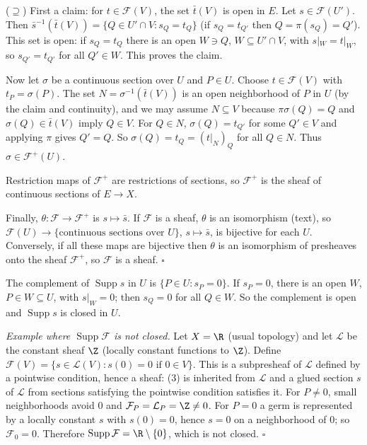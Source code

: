\documentclass[11pt]{article}
\begin{document}
($\supseteq$) First a claim: for $t\in\mathcal F(V)$, the set $\bar t(V)$ is open in $E$. Let $s\in\mathcal F(U')$. Then $\bar s^{-1}(\bar t(V))=\{Q\in U'\cap V: s_Q=t_Q\}$ (if $s_Q=t_{Q'}$ then $Q=\pi(s_Q)=Q'$). This set is open: if $s_Q=t_Q$ there is an open $W\ni Q$, $W\subseteq U'\cap V$, with $s|_W=t|_W$, so $s_{Q'}=t_{Q'}$ for all $Q'\in W$. This proves the claim.

Now let $\sigma$ be a continuous section over $U$ and $P\in U$. Choose $t\in\mathcal F(V)$ with $t_P=\sigma(P)$. The set $N=\sigma^{-1}(\bar t(V))$ is an open neighborhood of $P$ in $U$ (by the claim and continuity), and we may assume $N\subseteq V$ because $\pi\sigma(Q)=Q$ and $\sigma(Q)\in\bar t(V)$ imply $Q\in V$. For $Q\in N$, $\sigma(Q)=t_{Q'}$ for some $Q'\in V$ and applying $\pi$ gives $Q'=Q$. So $\sigma(Q)=t_Q=(t|_N)_Q$ for all $Q\in N$. Thus $\sigma\in\mathcal F^+(U)$.

Restriction maps of $\mathcal F^+$ are restrictions of sections, so $\mathcal F^+$ is the sheaf of continuous sections of $E\to X$.

Finally, $\theta\colon\mathcal F\to\mathcal F^+$ is $s\mapsto\bar s$. If $\mathcal F$ is a sheaf, $\theta$ is an isomorphism (text), so $\mathcal F(U)\to\{\text{continuous sections over }U\}$, $s\mapsto\bar s$, is bijective for each $U$. Conversely, if all these maps are bijective then $\theta$ is an isomorphism of presheaves onto the sheaf $\mathcal F^+$, so $\mathcal F$ is a sheaf. \hfill$\square$

\pf
The complement of $\operatorname{Supp}s$ in $U$ is $\{P\in U:s_P=0\}$. If $s_P=0$, there is an open $W$, $P\in W\subseteq U$, with $s|_W=0$; then $s_Q=0$ for all $Q\in W$. So the complement is open and $\operatorname{Supp}s$ is closed in $U$.

\emph{Example where $\operatorname{Supp}\mathcal F$ is not closed.} Let $X=\R$ (usual topology) and let $\mathcal L$ be the constant sheaf $\Z$ (locally constant functions to $\Z$). Define $\mathcal F(V)=\{s\in\mathcal L(V): s(0)=0\text{ if }0\in V\}$. This is a subpresheaf of $\mathcal L$ defined by a pointwise condition, hence a sheaf: (3) is inherited from $\mathcal L$ and a glued section $s$ of $\mathcal L$ from sections satisfying the pointwise condition satisfies it. For $P\ne0$, small neighborhoods avoid $0$ and $\mathcal F_P=\mathcal L_P=\Z\ne0$. For $P=0$ a germ is represented by a locally constant $s$ with $s(0)=0$, hence $s=0$ on a neighborhood of $0$; so $\mathcal F_0=0$. Therefore $\operatorname{Supp}\mathcal F=\R\setminus\{0\}$, which is not closed. \hfill$\square$
\end{document}
